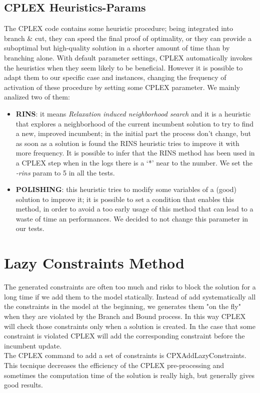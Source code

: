 \subsection{CPLEX Heuristics-Params}
The \textsc{CPLEX} code contains some heuristic procedure; being integrated into branch \& cut, they can speed the final proof of optimality, or they can provide a suboptimal but high-quality solution in a shorter amount of time than by branching alone. With default parameter settings, \textsc{CPLEX} automatically invokes the heuristics when they seem likely to be beneficial. However it is possible to adapt them to our specific case and instances, changing the frequency of activation of these procedure by setting some \textsc{CPLEX} parameter. We mainly analized two of them:
\begin{itemize}
\setlength{\parskip}{0pt}
\setlength{\itemsep}{0pt plus 1pt}
\item \textbf{RINS}: it means \textit{Relaxation induced neighborhood search} and it is a heuristic that explores a neighborhood of the current incumbent solution to try to find a new, improved incumbent; in the initial part the process don’t change, but as soon as a solution is found the RINS heuristic tries to improve it with more frequency. It is possible to infer that the RINS method has been used in a \textsc{CPLEX} step when in the logs there is a ‘*’ near to the number. We set the \textit{-rins} param to 5 in all the tests. 
\item \textbf{POLISHING}: this heuristic tries to modify some variables of a (good) solution to improve it; it is possible to set a condition that enables this method, in order to avoid a too early usage of this method that can lead to a waste of time an performances. We decided to not change this parameter in our tests.
\end{itemize}

\section{Lazy Constraints Method}
The generated constraints are often too much and risks to block the solution for a long time if we add them to the model statically.  
Instead of add systematically all the constraints in the model at the beginning, we generates them "on the fly" when they are violated by the Branch and Bound process. In this way \textsc{CPLEX} will check those constraints only when a solution is created. In the case that some constraint is violated \textsc{CPLEX} will add the corresponding constraint before the incumbent update. \\
The \textsc{CPLEX} command to add a set of constraints is CPXAddLazyConstraints. \\
This tecnique decreases the efficiency of the \textsc{CPLEX} pre-processing and sometimes the computation time of the solution is really high, but generally gives good results.

